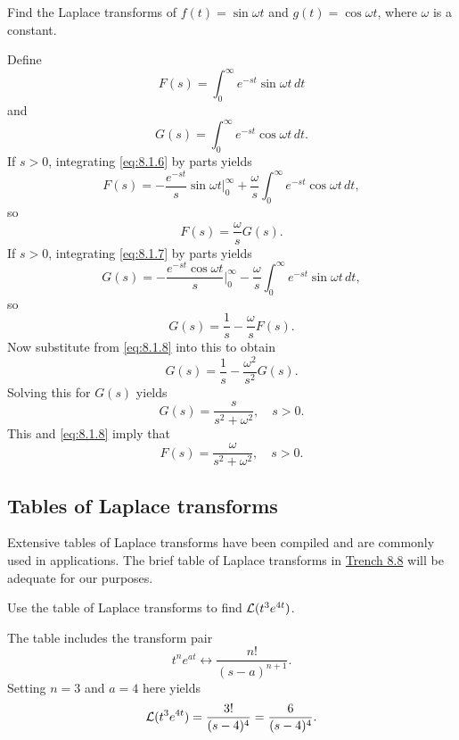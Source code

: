 \documentclass{ximera}
\begin{document}
\begin{example}\label{example:8.1.4} 
Find the Laplace transforms of $f(t)=\sin\omega t$ and
$g(t)=\cos\omega t$, where $\omega$ is a constant.

\begin{explanation}  
Define
\begin{equation}\label{eq:8.1.6}
F(s)=\int_0^\infty e^{-st}\sin\omega t\,dt
\end{equation}
and
\begin{equation}\label{eq:8.1.7}
G(s)=\int_0^\infty e^{-st}\cos\omega t\,dt.
\end{equation}
If $s>0$, integrating  \eqref{eq:8.1.6} by parts yields
$$
F(s)=-\frac{e^{-st}}{s}\sin\omega t\Big|_0^\infty+\frac{\omega}{s}
\int_0^\infty e^{-st}\cos\omega t\,dt,
$$
so
\begin{equation}\label{eq:8.1.8}
F(s)=\frac{\omega}{s}G(s).
\end{equation}
If $s>0$, integrating  \eqref{eq:8.1.7} by parts yields
$$
G(s)=-\frac{e^{-st}\cos\omega t}{s}\Big|_0^\infty - \frac{\omega}{s}
\int_0^\infty e^{-st}\sin\omega t\,dt,
$$
so
$$
G(s)=\frac{1}{s} - \frac{\omega}{s} F(s).
$$
Now substitute from  \eqref{eq:8.1.8} into this to obtain
$$
G(s)=\frac{1}{s} - \frac{\omega^2}{s^2} G(s).
$$
Solving this for $G(s)$ yields
$$
G(s)=\frac{s}{s^2+\omega^2},\quad s>0.
$$
This and  \eqref{eq:8.1.8} imply that
$$
F(s)=\frac{\omega}{s^2+\omega^2},\quad s>0.
$$
\end{explanation}
\end{example}
\subsection*{Tables of Laplace transforms}

Extensive tables of Laplace transforms have been compiled and are
commonly used in applications. The brief table of Laplace transforms
in \href{https://ximera.osu.edu/ode/main/laplaceTable/laplaceTable}{Trench 8.8} 
will be adequate for our purposes.

\begin{example}\label{example:8.1.5}  Use the
table of Laplace transforms to find  ${\cal L}(t^3e^{4t})$.

\begin{explanation}
The table includes the transform pair
$$
t^ne^{at}\leftrightarrow \frac{n!}{(s-a)^{n+1}}.
$$
Setting $n=3$ and $a=4$ here yields
$$
{\cal L}(t^3e^{4t})=\frac{3!}{(s-4)^4}=\frac{6}{(s-4)^4}.
$$
\end{explanation}
\end{example}
\end{document}
